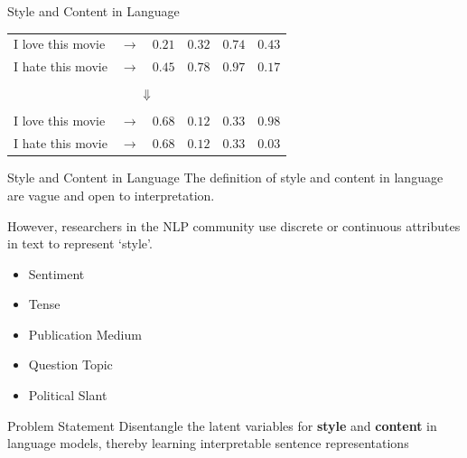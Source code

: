 \documentclass[aspectratio=169]{beamer}
\begin{document}
\begin{frame}{Style and Content in Language}
	\centering
	\LARGE
	\begin{table}[ht]
		\centering
		\begin{tabular}{ l  c | c | c | c | c |}
			\cline{3-6}
			I love this movie              & $\rightarrow$ & $0.21$ & $0.32$ & $0.74$ & $0.43$              \\
			\cline{3-6}
			I hate this movie              & $\rightarrow$ & $0.45$ & $0.78$ & $0.97$ & $0.17$              \\
			\cline{3-6}
			\pause
			\\\multicolumn{6}{c}{{\Huge\color{red}$\Downarrow$}}                                 \\ \\
			\cline{3-6}
			I {\color{red}love} this movie & $\rightarrow$ & $0.68$ & $0.12$ & $0.33$ & {\color{red}$0.98$} \\
			\cline{3-6}
			I {\color{red}hate} this movie & $\rightarrow$ & $0.68$ & $0.12$ & $0.33$ & {\color{red}$0.03$} \\
			\cline{3-6}
		\end{tabular}
	\end{table}
\end{frame}

\begin{frame}{Style and Content in Language}
	The definition of style and content in language are vague and open to interpretation.

	However, researchers in the NLP community use discrete or continuous attributes in text to represent `style'.
	\begin{itemize}
		\item Sentiment \citep{hu2017toward,shen2017style,fu2017style}
		\item Tense \citep{hu2017toward}
		\item Publication Medium \citep{fu2017style}
		\item Question Topic \citep{kim2017adversarially}
		\item Political Slant \citep{prabhumoye2018style}
	\end{itemize}
\end{frame}

\begin{frame}{Problem Statement}
	\centering
	\Huge{Disentangle the latent variables for \textbf{style} and \textbf{content} in language models, thereby learning interpretable sentence representations}
\end{frame}
\end{document}
